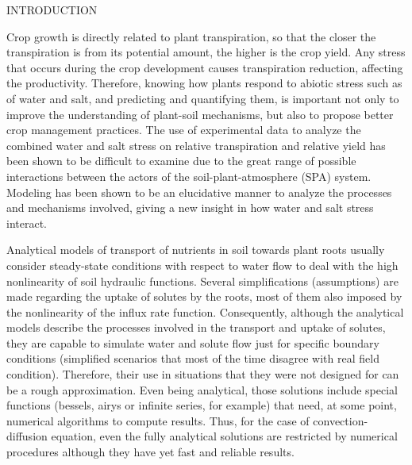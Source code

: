\cleardoublepage
\chap INTRODUCTION

Crop growth is directly related to plant transpiration, so that the closer the transpiration is from its potential amount, the higher is the crop yield. 
Any stress that occurs during the crop development causes transpiration reduction, affecting the productivity. 
Therefore, knowing how plants respond to abiotic stress such as of water and salt, and predicting and quantifying them, is important not only to improve the understanding of plant-soil mechanisms, but also to propose better crop management practices.
The use of experimental data to analyze the combined water and salt stress on relative transpiration and relative yield has been shown to be difficult to examine due to the great range of possible interactions between the actors of the soil-plant-atmosphere (SPA) system.
Modeling has been shown to be an elucidative manner to analyze the processes and mechanisms involved, giving a new insight in how water and salt stress interact.

Analytical models of transport of nutrients in soil towards plant roots usually consider steady-state conditions with respect to water flow to deal with the high nonlinearity of soil hydraulic functions. 
Several simplifications (assumptions) are made regarding the uptake of solutes by the roots, most of them also imposed by the nonlinearity of the influx rate function. 
Consequently, although the analytical models describe the processes involved in the transport and uptake of solutes, they are capable to simulate water and solute flow just for specific boundary conditions (simplified scenarios that most of the time  disagree with real field condition). Therefore, their use in situations that they were not designed for can be a rough approximation.
Even being analytical, those solutions include special functions (bessels, airys or infinite series, for example) that need, at some point, numerical algorithms to compute results.
Thus, for the case of convection-diffusion equation, even the fully analytical solutions are restricted by numerical procedures although they have yet fast and reliable results.

